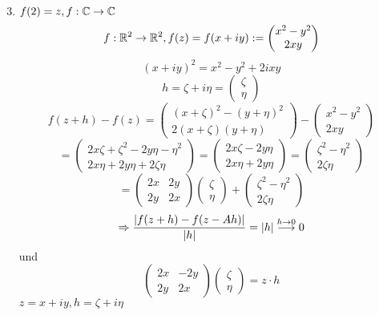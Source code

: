 \documentclass[../ana2.tex]{subfiles}
\begin{document}
\begin{bsp}
    \begin{enumerate}
        \setcounter{enumi}{2}
        \item \( f(2) = z, f:\mathbb{C}\rightarrow \mathbb{C} \)
        \[ f:\mathbb{R}^2\rightarrow \mathbb{R}^2, f(z) = f(x+iy) := \begin{pmatrix}
            x^2-y^2 \\
            2xy
        \end{pmatrix}\]
        \[ (x+iy)^2 = x^2 - y^2 + 2ixy \]
        \[ h = \zeta + i \eta = \begin{pmatrix}
            \zeta \\
            \eta
        \end{pmatrix} \]
        \[ f(z + h) - f(z) = \begin{pmatrix}
            (x + \zeta)^2 - (y + \eta)^2\\
            2 (x+\zeta)(y + \eta)
        \end{pmatrix} - \begin{pmatrix}
            x^2 - y^2\\
            2xy
        \end{pmatrix} \]
        \[ = \begin{pmatrix}
            2x\zeta + \zeta^2 - 2y\eta - \eta^2\\
            2x\eta + 2y\eta + 2\zeta \eta
        \end{pmatrix} = \begin{pmatrix}
            2x \zeta - 2y \eta \\
            2x\eta + 2y \eta 
        \end{pmatrix} = \begin{pmatrix}
            \zeta^2 - \eta^2 \\
            2 \zeta \eta
        \end{pmatrix} \]
        \[ = \begin{pmatrix}
            2x & 2y\\
            2y & 2x
        \end{pmatrix} \begin{pmatrix}
            \zeta\\ \eta
        \end{pmatrix} + \begin{pmatrix}
            \zeta^2 - \eta^2\\
            2\zeta \eta
        \end{pmatrix} \]        
        \[ \Rightarrow \frac{\left|f(z+h) - f(z - Ah)\right|}{\left|h\right|}
        = \left|h\right| \overset{h \rightarrow 0}{\longrightarrow} 0 \]
        und \[ \begin{pmatrix}
            2x & -2y\\
            2y & 2x
        \end{pmatrix} \begin{pmatrix}
            \zeta \\ \eta
        \end{pmatrix}
        = z \cdot h \]
        \( z = x + iy, h = \zeta + i \eta \)
    \end{enumerate}
\end{bsp}
\end{document}
